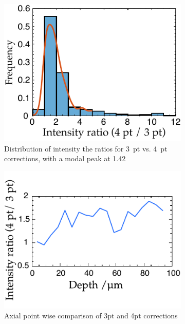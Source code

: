 \begin{figure}
	\centering
    \begin{subfigure}[t]{0.45\textwidth}
        \centering
        \includegraphics{in_situ/histogramofIntensityRatios_thesis}
        \caption{Distribution of intensity the ratios for 3~pt vs. 4~pt corrections, with a modal peak at 1.42}\label{fig:in_situ/histogramofIntensityRatios_thesis}
    \end{subfigure}
    \hfill
    \begin{subfigure}[t]{0.45\textwidth}
        \centering
        \includegraphics{in_situ/beadComparisonAxial_thesis}
        \caption{Axial point wise comparison of 3pt and 4pt corrections}\label{fig:in_situ/beadComparisonAxial_thesis}
    \end{subfigure}\vspace{0.05\textheight}
    \begin{subfigure}[t]{0.45\textwidth}

\end{subfigure}
\end{figure}
